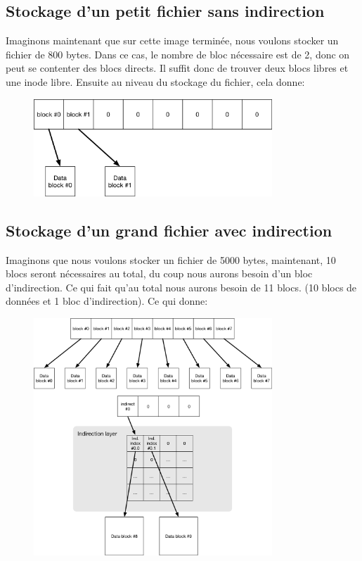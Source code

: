 \documentclass{article}
\begin{document}
\subsection{Stockage d'un petit fichier sans indirection}
Imaginons maintenant que sur cette image terminée, nous voulons stocker un fichier de 800 bytes. Dans ce cas, le nombre de bloc nécessaire est de 2, donc on peut se contenter des blocs directs. Il suffit donc de trouver deux blocs libres et une inode libre. Ensuite au niveau du stockage du fichier, cela donne:
\begin{figure}[H]
    \centering
    \includegraphics[width=0.8\textwidth]{FS_petit_fichier.png}
\end{figure}
\subsection{Stockage d'un grand fichier avec indirection}
Imaginons que nous voulons stocker un fichier de 5000 bytes, maintenant, 10 blocs seront nécessaires au total, du coup nous aurons besoin d'un bloc d'indirection. Ce qui fait qu'au total nous aurons besoin de 11 blocs. (10 blocs de données et 1 bloc d'indirection). Ce qui donne:
\begin{figure}[H]
    \centering
    \includegraphics[width=0.8\textwidth]{FS_grand_fichier.png}
\end{figure}
\end{document}
